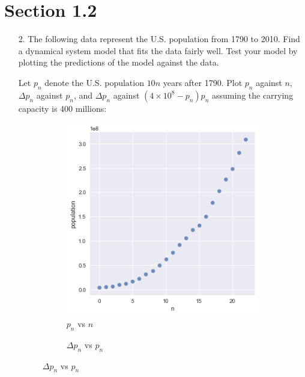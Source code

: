 \documentclass[10pt]{report}
\begin{document}
\section*{Section 1.2}
\begin{enumerate}
	\item [2.]
	The following data represent the U.S. population from 1790 to 2010. Find a dynamical system model that fits the data fairly well. Test your model by plotting the predictions of the model against the data.
	
	Let $p_n$ denote the U.S. population $10 n$ years after 1790. Plot $p_n$ against $n$, $\Delta p_n$ against $p_n$, and $\Delta p_n$ against $(4\times 10^8  - p_n) p_n$ assuming the carrying capacity is 400 millions:
	\begin{figure}[H]
		\centering
		\begin{subfigure}[b]{.3\linewidth}
			\caption{$p_n$ vs $n$}
			\includegraphics[width=\linewidth]{s1_2/p-n.png}
		\end{subfigure}
		\begin{subfigure}[b]{.3\linewidth}
			\caption{$\Delta p_n$ vs $p_n$}

\end{subfigure}
\end{figure}
\end{enumerate}
\end{document}

